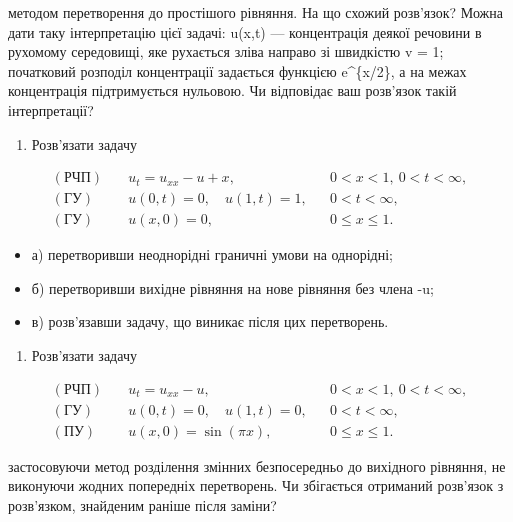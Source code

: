 \documentclass[
  ukrainian,
]{article}
\providecommand{\tightlist}{%
  \setlength{\itemsep}{0pt}\setlength{\parskip}{0pt}}
\begin{document}
методом перетворення до простішого рівняння. На що схожий розв'язок?
Можна дати таку інтерпретацію цієї задачі: u(x,t) --- концентрація
деякої речовини в рухомому середовищі, яке рухається зліва направо зі
швидкістю v = 1; початковий розподіл концентрації задається функцією
e\^{}\{x/2\}, а на межах концентрація підтримується нульовою. Чи
відповідає ваш розв'язок такій інтерпретації?

\begin{enumerate}
\def\labelenumi{\arabic{enumi}.}
\setcounter{enumi}{1}
\tightlist
\item
  Розв'язати задачу
\end{enumerate}

\[
\begin{aligned}
(\text{РЧП})\quad & u_t = u_{xx} - u + x, && 0 < x < 1,\ 0 < t < \infty, \\
(\text{ГУ})\quad & u(0,t) = 0,\quad u(1,t) = 1, && 0 < t < \infty, \\
(\text{ГУ})\quad & u(x,0) = 0, && 0 \leqslant x \leqslant 1.
\end{aligned}
\]

\begin{itemize}
\item
  а) перетворивши неоднорідні граничні умови на однорідні;
\item
  б) перетворивши вихідне рівняння на нове рівняння без члена -u;
\item
  в) розв'язавши задачу, що виникає після цих перетворень.
\end{itemize}

\begin{enumerate}
\def\labelenumi{\arabic{enumi}.}
\setcounter{enumi}{2}
\tightlist
\item
  Розв'язати задачу
\end{enumerate}

\[
\begin{aligned}
(\text{РЧП})\quad & u_t = u_{xx} - u, && 0 < x < 1,\ 0 < t < \infty, \\
(\text{ГУ})\quad & u(0,t) = 0,\quad u(1,t) = 0, && 0 < t < \infty, \\
(\text{ПУ})\quad & u(x,0) = \sin(\pi x), && 0 \leqslant x \leqslant 1.
\end{aligned}
\]

застосовуючи метод розділення змінних безпосередньо до вихідного
рівняння, не виконуючи жодних попередніх перетворень. Чи збігається
отриманий розв'язок з розв'язком, знайденим раніше після заміни?
\end{document}
